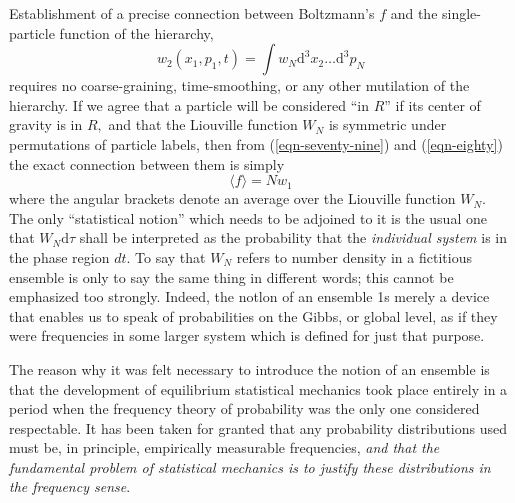 \documentclass[]{article}
\begin{document}
Establishment of a precise connection between Boltzmann's $f$ and the single-particle function of the hierarchy,
\begin{equation}
w_{2}\left(x_{1}, p_{1}, t\right)=\int w_{N}\text{d}^{3} x_{2} \ldots\text{d}^{3} p_{N} \label{eqn-eighty}
\end{equation}
requires no coarse-graining, time-smoothing, or any other mutilation of the hierarchy. If we agree that a particle will be considered ``in $R$'' if its center of gravity is in $R,$ and that the Liouville function $W_{N}$ is symmetric under permutations of particle labels, then from (\ref{eqn-seventy-nine}) and (\ref{eqn-eighty}) the exact connection between them is simply
\begin{equation}
\langle f\rangle= Nw _{1} \label{eqn-eighty-one}
\end{equation}
where the angular brackets denote an average over the Liouville function $W_{N}$. The only ``statistical notion'' which needs to be adjoined to it is the usual one that $W_{N}\text{d}\tau$ shall be interpreted as the probability that the \emph{individual system} is in the phase region $dt$. To say that $W _{ N }$ refers to number density in a fictitious ensemble is only to say the same thing in different words; this cannot be emphasized too strongly. Indeed, the notlon of an ensemble 1s merely a device that enables us to speak of probabilities on the Gibbs, or global level, as if they were frequencies in some larger system which is defined for just that purpose. 

The reason why it was felt necessary to introduce the notion of an ensemble is that the development of equilibrium statistical mechanics took place entirely in a period when the frequency theory of probability was the only one considered respectable. It has been taken for granted that any probability distributions used must be, in principle, empirically measurable frequencies, \emph{and that the fundamental problem of statistical mechanics is to justify these distributions in the frequency sense}.
\end{document}
